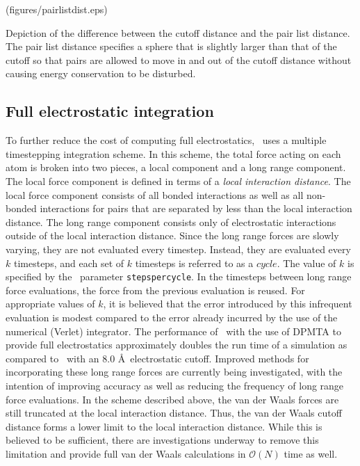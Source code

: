 \displayepsf[htb] (figures/pairlistdist.eps) {
  \caption[Example of cutoff and pairlist distance uses]
  {{\small Depiction of the difference between the cutoff distance and the
  pair list distance.  The pair list distance specifies a sphere that is
  slightly larger than that of the cutoff so that pairs are allowed to
  move in and out of the cutoff distance without causing energy conservation
  to be disturbed.}}
  \label{fig:pairlistdist}
}

\subsection{Full electrostatic integration}
\label{section:fmadesc}

To further reduce the cost of computing full electrostatics, 
\NAMD\ uses a multiple timestepping integration scheme.  In this scheme, 
the total force acting on each atom is broken into two pieces, a local 
component and a long range component.  
The local force component is defined in terms of a {\it local interaction
distance}.  The local force component consists of all bonded interactions
as well as all non-bonded interactions for pairs that are separated by
less than the local interaction distance.  
The long range component consists only of 
electrostatic interactions outside of the local interaction distance.
Since the long range forces are slowly varying, they are not evaluated
every timestep.  Instead, they are evaluated every $k$ timesteps, and
each set of $k$ timesteps is referred to as a $cycle$.
The value of $k$ is specified by the \NAMD\ parameter
\verb!stepspercycle!.  
In the timesteps between long range force evaluations, the force from
the previous evaluation is reused.  For appropriate values of $k$,
it is believed that the error introduced by this infrequent evaluation
is modest compared to the error already incurred by the use of the numerical
(Verlet) integrator.  
The performance of \NAMD\ with the use of DPMTA to provide 
full electrostatics approximately doubles the 
run time of a simulation as compared to \NAMD\ with an 
$8.0$ \AA\ electrostatic cutoff.  
Improved methods for incorporating these long range forces
are currently being investigated, 
with the intention of improving accuracy as well as 
reducing the frequency of long range force evaluations.  
\prettypar
In the scheme described above, the van der Waals forces are still 
truncated at the local interaction distance.  
Thus, the van der Waals cutoff distance 
forms a lower limit to the local interaction distance.  While this is
believed to be sufficient, there are investigations underway to remove
this limitation and provide full van der Waals calculations in 
${\mathcal O}(N)$ time as well.  


